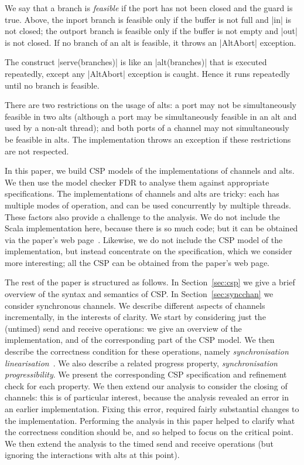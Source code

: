 We say that a branch is \emph{feasible} if the port has not been closed and
the guard is true.  Above, the inport branch is feasible only if the buffer is
not full and |in| is not closed; the outport branch is feasible only if the
buffer is not empty and |out| is not closed.  If no branch of an alt is
feasible, it throws an |AltAbort| exception.

The construct |serve(branches)| is like an |alt(branches)| that is executed
repeatedly, except any |AltAbort| exception is caught.  Hence it runs
repeatedly until no branch is feasible. 

There are two restrictions on the usage of alts: a port may not be
simultaneously feasible in two alts (although a port may be simultaneously
feasible in an alt and used by a non-alt thread); and both ports of a channel
may not simultaneously be feasible in alts.  The implementation throws an
exception if these restrictions are not respected.

In this paper, we build CSP models of the implementations of channels and
alts.  We then use the model checker FDR to analyse them against appropriate
specifications. 
%
The implementations of channels and alts are tricky: each has multiple modes
of operation, and can be used concurrently by multiple threads.  These factors
also provide a challenge to the analysis.
%
We do not include the Scala implementation here, because there is so much
code; but it can be obtained via the paper's web page~.
Likewise, we do not include the CSP model of the implementation, but instead
concentrate on the specification, which we consider more interesting; all the
CSP can be obtained from the paper's web page.

The rest of the paper is structured as follows.  In Section~\ref{sec:csp} we
give a brief overview of the syntax and semantics of CSP\@.  In
Section~\ref{sec:syncchan} we consider synchronous channels.  We describe
different aspects of channels incrementally, in the interests of clarity.  We
start by considering just the (untimed) send and receive operations: we give
an overview of the implementation, and of the corresponding part of the CSP
model.  We then describe the correctness condition for these operations,
namely \emph{synchronisation linearisation}~\cite{LL:synchronisation}.  We
also describe a related progress property, \emph{synchronisation
  progressibility}.  We present the corresponding CSP specification and
refinement check for each property.  We then extend our analysis to consider
the closing of channels: this is of particular interest, because the analysis
revealed an error in an earlier implementation.  Fixing this error, required
fairly substantial changes to the implementation.  Performing the analysis in
this paper helped to clarify what the correctness condition should be, and so
helped to focus on the critical point.  We then extend the analysis to the
timed send and receive operations (but ignoring the interactions with alts at
this point).

